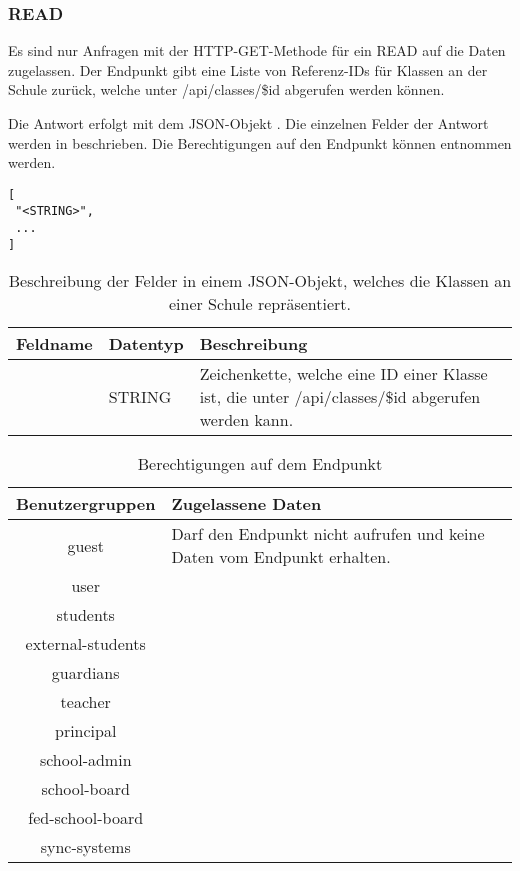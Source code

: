 \subsubsection{READ}
\label{sec:rest:api:schools:classes:read}
Es sind nur Anfragen mit der HTTP-GET-Methode für ein READ auf die Daten zugelassen.
Der Endpunkt gibt eine Liste von Referenz-IDs für Klassen an der Schule zurück, welche unter /api/classes/\$id abgerufen werden können.

Die Antwort erfolgt mit dem JSON-Objekt . 
Die einzelnen Felder der Antwort werden in  beschrieben.
Die Berechtigungen auf den Endpunkt können  entnommen werden.


\begin{lstlisting}[caption={JSON-Antwort für einen GET-Aufruf der Route /api/schools/\$id/classes},label={lst:code:rest:api:schools:classes:read:ret},frame=tlrb]
[
 "<STRING>",
 ...
]
\end{lstlisting}
\begin{longtable}{|p{}|p{}|p{}|}
		\caption{Beschreibung der Felder in einem JSON-Objekt, welches die Klassen an einer Schule repräsentiert.}
\endfoot
		\caption{Beschreibung der Felder in einem JSON-Objekt, welches die Klassen an einer Schule repräsentiert.}
		\label{tab:rest:api:schools:classes:read:ret:json}
\endlastfoot 
\hline
			\textbf{Feldname} & \textbf{Datentyp} & \textbf{Beschreibung} \\ \hline
\endhead
 & STRING & Zeichenkette, welche eine ID einer Klasse ist, die unter /api/classes/\$id abgerufen werden kann. \\ \hline
\end{longtable}

\begin{longtable}{|c|p{}|}
\caption{Berechtigungen auf dem Endpunkt}
\endfoot
		\caption{Berechtigungen auf dem Endpunkt}
		\label{tab:rest:api:schools:classes:read:right}
\endlastfoot
\hline
\textbf{Benutzergruppen} & \textbf{Zugelassene Daten} \\ \hline
\endhead
guest & Darf den Endpunkt nicht aufrufen und keine Daten vom Endpunkt erhalten. \\ \hline
user &  \\ \hline 
students & \\ \hline
external-students & \\ \hline
guardians & \\ \hline
teacher & \\ \hline
principal & \\ \hline
school-admin & \\ \hline
school-board & \\ \hline
fed-school-board & \\ \hline
sync-systems & \\ \hline
	\end{longtable}